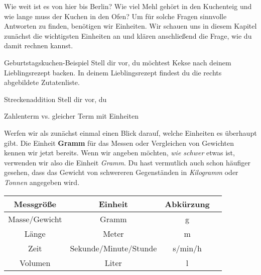 \documentclass[../../main.tex]{subfiles}
\begin{document}
    \newcommand{\km}{\ensuremath{\,\mathrm{km}}}
    \newcommand{\minute}{\ensuremath{\,\mathrm{min}}}
    \newcommand{\s}{\ensuremath{\,\mathrm{s}}}

    \label{chap:einheiten}
    Wie weit ist es von hier bis Berlin? Wie viel Mehl gehört in den Kuchenteig und wie lange muss der Kuchen in den Ofen? 
    Um für solche Fragen sinnvolle Antworten zu finden, benötigen wir Einheiten. Wir schauen uns in diesem Kapitel 
    zunächst die wichtigsten Einheiten an und klären anschließend die Frage, wie du damit rechnen kannst.

    \begin{example}{Geburtstagskuchen-Beispiel}
        Stell dir vor, du möchtest Kekse nach deinem Lieblingsrezept backen. In deinem Lieblingsrezept findest du die rechts abgebildete Zutatenliste.
        
    \end{example}

    \begin{example}{Streckenaddition}
        Stell dir vor, du 
    \end{example}

    Zahlenterm vs. gleicher Term mit Einheiten

    Werfen wir als zunächst einmal einen Blick darauf, welche Einheiten es überhaupt gibt. Die Einheit \textbf{Gramm} für das
    Messen oder Vergleichen von Gewichten kennen wir jetzt bereits. Wenn wir angeben möchten, \emph{wie schwer} etwas ist, verwenden wir also
    die Einheit \emph{Gramm}. Du hast vermutlich auch schon häufiger gesehen, dass das Gewicht von schwereren Gegenständen in \emph{Kilogramm} oder \emph{Tonnen} angegeben wird. 

    \begin{center}
        \begin{tabular}{cccc}\toprule
            \textbf{Messgröße} & \textbf{Einheit} & \textbf{Abkürzung}\\\midrule
            Masse/Gewicht & Gramm & g\\
            Länge & Meter & m\\
            Zeit & Sekunde/Minute/Stunde & s/min/h\\
            Volumen & Liter & l\\
            \bottomrule
        \end{tabular}
    \end{center}
\end{document}
